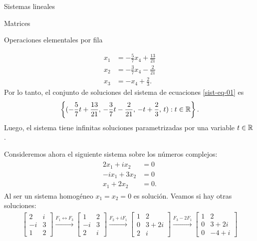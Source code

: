 \begin{chapter}{Sistemas lineales}
\begin{section}{Matrices}
\begin{subsection}{Operaciones elementales por fila}
\begin{ejemplo*}
\begin{align*}
                    x_1  &=-\frac{5}{7}x_4 + \frac{13}{21}\\
                    x_2  &=- \frac{3}{7}x_4 -\frac{2}{21} \\
                    x_3  &= -x_4+\frac{2}{3}. 
                    \end{align*}
                    Por lo tanto, el conjunto de soluciones del sistema de ecuaciones \eqref{sist-eq-01} es
                    $$
                    \left\{(-\frac{5}{7}t+ \frac{13}{21},\,- \frac{3}{7}t-\frac{2}{21},\, -t+\frac{2}{3},\,t): t \in \mathbb R \right\}.
                    $$
                    Luego, el sistema tiene infinitas soluciones parametrizadas por una variable $t \in \mathbb R$.
                \end{ejemplo*}
                
                
                \begin{ejemplo*}
                    Consideremos ahora el siguiente sistema sobre los números complejos:
                    \begin{align}\label{sist-eq-03}
                    \begin{split}
                    2x_1 +i x_2 &= 0 \\
                    -ix_1 +3x_2  &=0 \\
                    x_1 +2x_2  &= 0.
                    \end{split}
                    \end{align}
                    Al ser un sistema homogéneo $x_1=x_2 = 0$ es solución. Veamos si hay otras soluciones: 
                    \begin{multline*}
                    \begin{bmatrix} 2&i \\ -i&3 \\ 1&2 \end{bmatrix}
                    \stackrel{F_1\leftrightarrow F_3}{\longrightarrow} 
                    \begin{bmatrix} 1&2 \\ -i&3 \\ 2&i \end{bmatrix}
                    \stackrel{F_2+iF_1}{\longrightarrow} 
                    \begin{bmatrix} 1&2 \\ 0&3+2i \\ 2&i \end{bmatrix}
                    \stackrel{F_3-2F_1}{\longrightarrow} 
                    \begin{bmatrix} 1&2 \\ 0&3+2i \\ 0&-4+i \end{bmatrix}

\end{multline*}
\end{ejemplo*}
\end{subsection}
\end{section}
\end{chapter}
